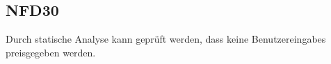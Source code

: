 \subsection*{NFD30}
Durch \gls{statische Analyse} kann geprüft werden, dass keine \Glspl{Benutzereingabe} preisgegeben werden.